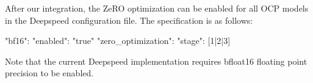 

After our integration, the ZeRO optimization can be enabled for all OCP models in the Deepspeed configuration 
file. The specification is as follows:

\begin{json}
{
    "bf16": {
        "enabled": "true"
    }
    "zero_optimization": {
        "stage": [1|2|3]
    }
}
\end{json}

Note that the current Deepspeed implementation requires bfloat16 floating point precision to be enabled. 

